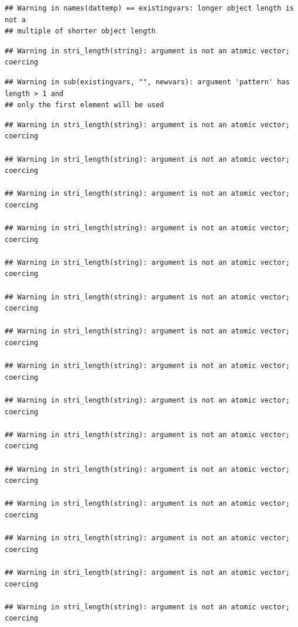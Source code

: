 \documentclass[
]{article}
\begin{document}
\begin{verbatim}
## Warning in names(dattemp) == existingvars: longer object length is not a
## multiple of shorter object length
\end{verbatim}

\begin{verbatim}
## Warning in stri_length(string): argument is not an atomic vector; coercing
\end{verbatim}

\begin{verbatim}
## Warning in sub(existingvars, "", newvars): argument 'pattern' has length > 1 and
## only the first element will be used
\end{verbatim}

\begin{verbatim}
## Warning in stri_length(string): argument is not an atomic vector; coercing

## Warning in stri_length(string): argument is not an atomic vector; coercing

## Warning in stri_length(string): argument is not an atomic vector; coercing

## Warning in stri_length(string): argument is not an atomic vector; coercing

## Warning in stri_length(string): argument is not an atomic vector; coercing

## Warning in stri_length(string): argument is not an atomic vector; coercing

## Warning in stri_length(string): argument is not an atomic vector; coercing

## Warning in stri_length(string): argument is not an atomic vector; coercing

## Warning in stri_length(string): argument is not an atomic vector; coercing

## Warning in stri_length(string): argument is not an atomic vector; coercing

## Warning in stri_length(string): argument is not an atomic vector; coercing

## Warning in stri_length(string): argument is not an atomic vector; coercing

## Warning in stri_length(string): argument is not an atomic vector; coercing

## Warning in stri_length(string): argument is not an atomic vector; coercing

## Warning in stri_length(string): argument is not an atomic vector; coercing


\end{verbatim}
\end{document}
